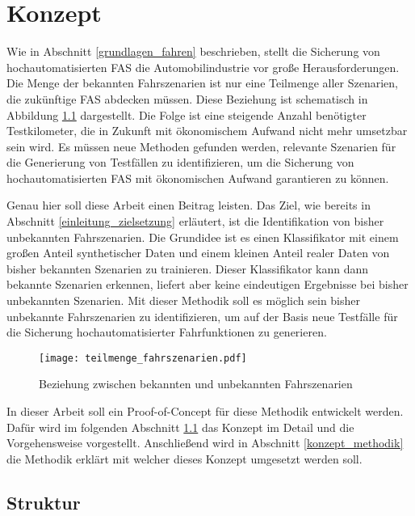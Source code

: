 
\chapter{Konzept}
\label{konzept}

Wie in Abschnitt \ref{grundlagen_fahren} beschrieben, stellt die Sicherung von hochautomatisierten \ac{FAS} die Automobilindustrie vor große Herausforderungen. Die Menge der bekannten Fahrszenarien ist nur eine Teilmenge aller Szenarien, die zukünftige \ac{FAS} abdecken müssen. Diese Beziehung ist schematisch in Abbildung \ref{fig_teilmenge_fahrszenarien} dargestellt. Die Folge ist eine steigende Anzahl benötigter Testkilometer, die in Zukunft mit ökonomischem Aufwand nicht mehr umsetzbar sein wird. Es müssen neue Methoden gefunden werden, relevante Szenarien für die Generierung von Testfällen zu identifizieren, um die Sicherung von hochautomatisierten \ac{FAS} mit ökonomischen Aufwand garantieren zu können.

Genau hier soll diese Arbeit einen Beitrag leisten. Das Ziel, wie bereits in Abschnitt \ref{einleitung_zielsetzung} erläutert, ist die Identifikation von bisher unbekannten Fahrszenarien. Die Grundidee ist es einen Klassifikator mit einem großen Anteil synthetischer Daten und einem kleinen Anteil realer Daten von bisher bekannten Szenarien zu trainieren. Dieser Klassifikator kann dann bekannte Szenarien erkennen, liefert aber keine eindeutigen Ergebnisse bei bisher unbekannten Szenarien. Mit dieser Methodik soll es möglich sein bisher unbekannte Fahrszenarien zu identifizieren, um auf der Basis neue Testfälle für die Sicherung hochautomatisierter Fahrfunktionen zu generieren.

\begin{figure}[h]
\centering
\texttt{[image: teilmenge\_fahrszenarien.pdf]}
\caption{Beziehung zwischen bekannten und unbekannten Fahrszenarien}
\label{fig_teilmenge_fahrszenarien}
\end{figure}

In dieser Arbeit soll ein Proof-of-Concept für diese Methodik entwickelt werden. Dafür wird im folgenden Abschnitt \ref{konzept_struktur} das Konzept im Detail und die Vorgehensweise vorgestellt. Anschließend wird in Abschnitt \ref{konzept_methodik} die Methodik erklärt mit welcher dieses Konzept umgesetzt werden soll.


\section{Struktur}
\label{konzept_struktur}

